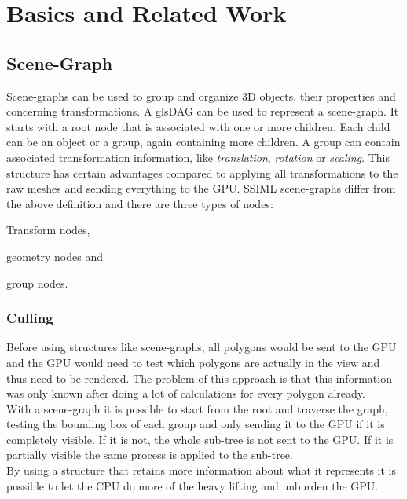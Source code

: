 
\section{Basics and Related Work}
\label{basics-and-related-work}

\subsection{Scene-Graph}\label{scene-graph}

Scene-graphs can be used to group and organize \gls{3D} objects, their properties and
concerning transformations. A gls{DAG} can be used to represent a scene-graph.
It starts with a root node that is associated with one or more children. Each
child can be an object or a group, again containing more children. A group can
contain associated transformation information, like \emph{translation},
\emph{rotation} or \emph{scaling}. This structure has certain advantages
compared to applying all transformations to the raw meshes and sending
everything to the \gls{GPU}. \cite{realityprime} \gls{SSIML} \cite{Lenk:2012:MID:2338714.2338742} scene-graphs differ from the
above definition and there are three types of nodes:

\begin{itemize*}
  \item Transform nodes,
  \item geometry nodes and
  \item group nodes.
\end{itemize*}

\subsubsection{Culling}\label{culling}

Before using structures like scene-graphs, all polygons would be sent to
the \gls{GPU} and the \gls{GPU} would need to test which polygons are actually in the
view and thus need to be rendered. The problem of this approach is
that this information was only known after doing a lot of calculations
for every polygon already.\\
With a scene-graph it is possible to start from the root and traverse the
graph, testing the bounding box of each group and only sending it to the
\gls{GPU} if it is completely visible. If it is not, the whole sub-tree is not
sent to the \gls{GPU}. If it is partially visible the same process is applied
to the sub-tree.\\
By using a structure that retains more information about what it
represents it is possible to let the CPU do more of the heavy
lifting and unburden the \gls{GPU}.

